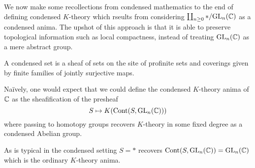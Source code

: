 We now make some recollections from condensed mathematics to the end of defining condensed $K$-theory which rseults from considering $\coprod_{n\geq0}*/\mathrm{GL}_{n}(\mathbb{C})$ as a condensed anima. The upshot of this approach is that it is able to preserve topological information such as local compactness, instead of treating $\mathrm{GL}_{n}(\mathbb{C})$ as a mere abstract group. 
\begin{definition}\label{def: condensed set}
    A condensed set is a sheaf of sets on the site of profinite sets and coverings given by finite families of jointly surjective maps. 
\end{definition}
Na\"{i}vely, one would expect that we could define the condensed $K$-theory anima of $\mathbb{C}$ as the sheafification of the presheaf 
$$S\mapsto K(\mathrm{Cont}(S,\mathrm{GL}_{n}(\mathbb{C})))$$
where passing to homotopy groups recovers $K$-theory in some fixed degree as a condensed Abelian group. 
\begin{remark}
    As is typical in the condensed setting $S=*$ recovers $\mathrm{Cont}(S,\mathrm{GL}_{n}(\mathbb{C}))=\mathrm{GL}_{n}(\mathbb{C})$ which is the ordinary $K$-theory anima.
\end{remark}

